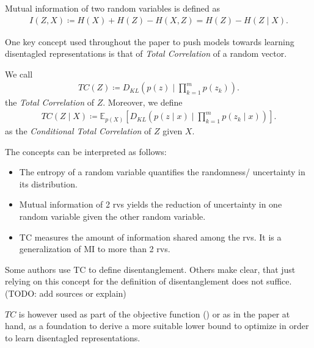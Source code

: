 \documentclass[twoside,11pt]{article}
\begin{document}
\begin{definition}
  Mutual information of two random variables is defined as
  \begin{align*}
    I(Z, X) \coloneqq H(X) + H(Z) - H(X, Z) = H(Z) - H(Z \mid X).
  \end{align*}
\end{definition}

One key concept used throughout the paper to push models towards learning disentagled representations is that of \textit{Total Correlation} of a random vector.

\begin{definition}
  We call
  \begin{align*}
    TC(Z) \coloneqq D_{KL}(p(z) \mid \prod_{k=1}^{m}p(z_{k})).
  \end{align*}
  the \textit{Total Correlation} of $Z$. Moreover, we define
  \begin{align*}
    TC(Z \mid X) \coloneqq \mathbb{E}_{p(X)}[D_{KL}(p(z \mid x) \mid \prod_{k=1}^{m}p(z_{k} \mid x))].
  \end{align*}
  as the \textit{Conditional Total Correlation} of $Z$ given $X$.
\end{definition}

\begin{remark}[Interpretation]
  The concepts can be interpreted as follows:
  \begin{itemize}
    \item The entropy of a random variable quantifies the randomness/ uncertainty in its distribution.
    \item Mutual information of 2 rvs yields the reduction of uncertainty in one random variable given the other random variable.
    \item TC measures the amount of information shared among the rvs. It is a generalization of MI to more than 2 rvs.
  \end{itemize}
\end{remark}

 Some authors use TC to define disentanglement. Others make clear, that just relying on this concept for the definition of disentanglement does not suffice. (TODO: add sources or explain)

$TC$ is however used as part of the objective function (\cite{FactorVAE}) or as in the paper at hand, as a foundation to derive a more suitable lower bound to optimize in order to learn disentagled representations.
\end{document}
